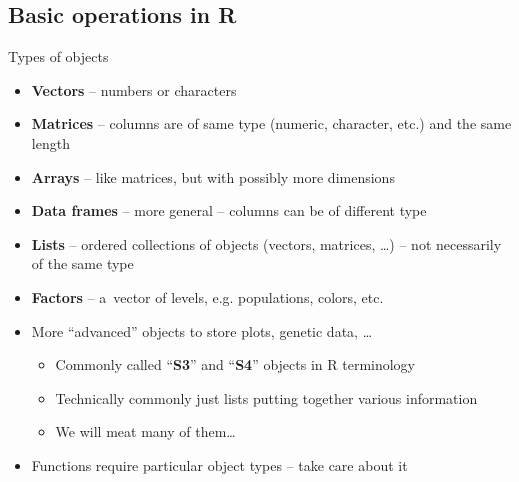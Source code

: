\documentclass[compress, ucs, xelatex, 11pt, xcolor=svgnames,
  hyperref={
    bookmarks=true,
    unicode=true,
    colorlinks=true,
    pdftitle={Molecular data in R},
    plainpages=false,
    pdfauthor={Vojtech Zeisek},
    pdfsubject={Course about phylogeny and evolution in R},
    pdfcreator={XeLaTeX},
    pdfkeywords={R, evolution, phylogeny, molecular data},
    linkcolor=Tomato,
    anchorcolor=SaddleBrown,
    citecolor=Goldenrod,
    filecolor=DarkMagenta,
    menucolor=Sienna,
    urlcolor=DarkTurquoise,
    pdftex},
  url={hyphens, lowtilde} %
  ]{beamer}
\begin{document}
\subsection{Basic operations in R}

\begin{frame}{Types of objects}
\begin{itemize}
 \item \textbf{Vectors} -- numbers or characters
 \item \textbf{Matrices} -- columns are of same type (numeric, character, etc.) and the same length
 \item \textbf{Arrays} -- like matrices, but with possibly more dimensions
 \item \textbf{Data frames} -- more general -- columns can be of different type
 \item \textbf{Lists} -- ordered collections of objects (vectors, matrices, \ldots) -- not necessarily of the same type
 \item \textbf{Factors} -- a~vector of levels, e.g. populations, colors, etc.
 \item More ``advanced'' objects to store plots, genetic data, \ldots
 \begin{itemize}
  \item Commonly called ``\textbf{S3}'' and ``\textbf{S4}'' objects in R terminology
  \item Technically commonly just lists putting together various information
  \item We will meat many of them\ldots
 \end{itemize}
 \item Functions require particular object types -- take care about it
\end{itemize}
\end{frame}
\end{document}
